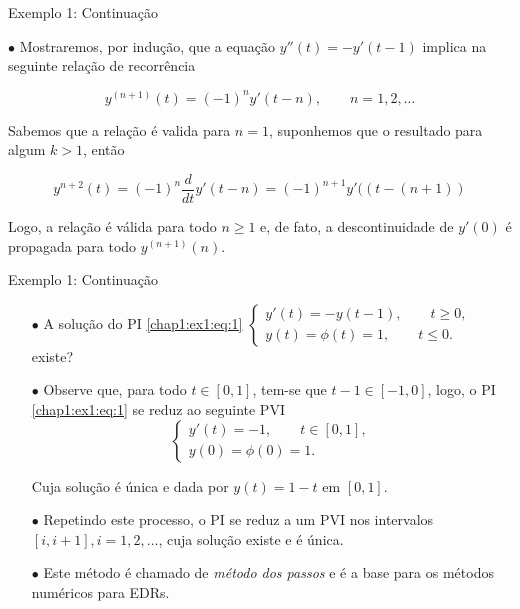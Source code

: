 \documentclass{beamer}
\theoremstyle{plain}
\theoremstyle{definition}
\begin{document}

\begin{frame}{Exemplo 1: Continuação}

    
    \phantom{aa} $\bullet$ Mostraremos, por indução, que a equação $ y''(t) = - y'(t - 1)$ implica na seguinte relação de recorrência

        \begin{equation*}
            y^{(n+1)}(t) = (-1)^n y' (t-n), \qquad n = 1, 2, \dots
            \label{ex_intro1_eq2}
        \end{equation*} 

        Sabemos que a relação é valida para $n = 1$, suponhemos que o resultado para algum $k>1$, então 
    
        \[
            y^{n+2}(t) = (-1)^n \frac{d}{dt} y' (t-n) = (-1)^{n+1} y'((t-(n+1))
        \]

        Logo, a relação é válida para todo $n \geq 1$ e, de fato, a descontinuidade de $y'(0)$ é propagada para todo $y^{(n+1)}(n)$.

\end{frame}


\begin{frame}{Exemplo 1: Continuação}
        \begin{itemize}
            \item[$\bullet$] A solução do PI \eqref{chap1:ex1:eq:1}
                $
                \begin{cases}
                    y'(t) = -y(t - 1), \qquad t \geq 0, \\
                    y(t) = \phi(t) = 1, \qquad t \leq 0.
                \end{cases} 
                $
                existe?
            \item[$\bullet$] Observe que, para todo $t \in [0,1]$, tem-se que $t-1 \in [-1, 0]$, logo, o PI \eqref{chap1:ex1:eq:1} se reduz ao seguinte PVI
                \begin{equation*}
                    \begin{cases}
                        y'(t) = -1, \qquad t \in [0, 1], \\
                        y(0) = \phi(0) = 1.
                    \end{cases} 
                \end{equation*}

                Cuja solução é única e dada por $y(t) = 1 - t$ em $[0, 1]$. 
        
            \item[$\bullet$] Repetindo este processo, o PI se reduz a um PVI nos intervalos $[i, i+1], i = 1, 2, \dots$, cuja solução existe e é única. 
            \item[$\bullet$] Este método é chamado de \textit{método dos passos} e é a base para os métodos numéricos para EDRs.
        \end{itemize}


\end{frame}
\end{document}
